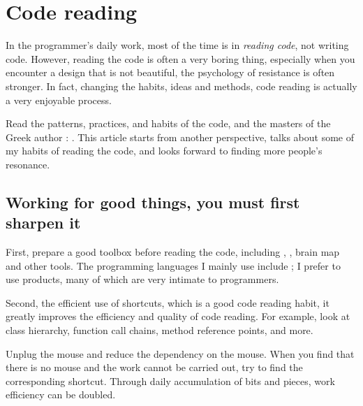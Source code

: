 \chapter{Code reading} 
\label{ch:code-reading}
\begin{content}
In the programmer's daily work, most of the time is in \emph{reading code}, not writing code. However, reading the code is often a very boring thing, especially when you encounter a design that is not beautiful, the psychology of resistance is often stronger. In fact, changing the habits, ideas and methods, code reading is actually a very enjoyable process.

Read the patterns, practices, and habits of the code, and the masters of the Greek author : . This article starts from another perspective, talks about some of my habits of reading the code, and looks forward to finding more people's resonance.
\end{content}


\section{Working for good things, you must first sharpen it}
\begin{content}
First, prepare a good toolbox before reading the code, including , , brain map and other tools. The programming languages ​​I mainly use include ; I prefer to use  products, many of which are very intimate to programmers.

Second, the efficient use of shortcuts, which is a good code reading habit, it greatly improves the efficiency and quality of code reading. For example, look at class hierarchy, function call chains, method reference points, and more.

\begin{remark}
Unplug the mouse and reduce the dependency on the mouse. When you find that there is no mouse and the work cannot be carried out, try to find the corresponding shortcut. Through daily accumulation of bits and pieces, work efficiency can be doubled.
\end{remark}

\end{content}


